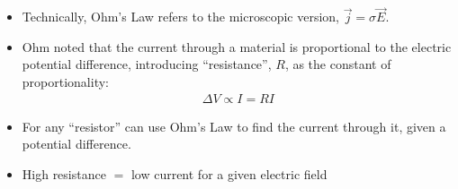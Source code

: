 \documentclass[aspectratio=169,
hyperref={colorlinks,urlcolor=blue}
]{beamer}
\begin{document}





{
\begin{itemize}
\item Technically, Ohm’s Law refers to the microscopic version, $\vec j=\sigma \vec E$.
\item Ohm noted that the current through a material is proportional to the electric potential difference, introducing ``resistance'', $R$, as the constant of proportionality:
\begin{align*}
\Delta V \propto I= R I
\end{align*}
\item  For any ``resistor'' can use Ohm’s Law to find the current through it, given a potential difference.
\item High resistance $=$ low current for a given electric field
\end{itemize}


}
{
}







\end{document}
